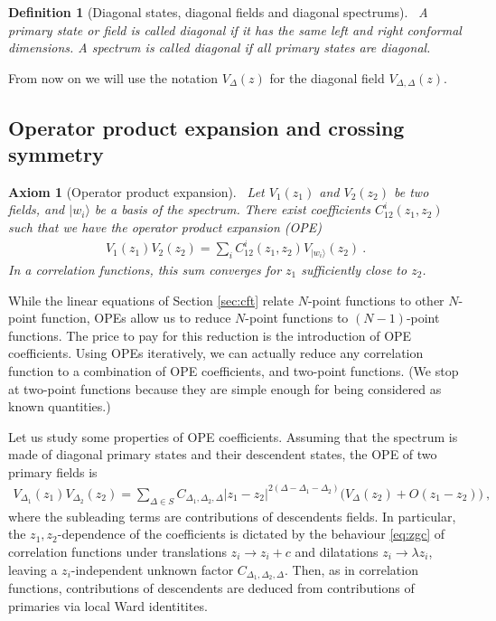 \documentclass[12pt, a4paper]{article}
\theoremstyle{break}
\newtheorem{hyp}[exo]{Axiom}
\newtheorem{defn}[exo]{Definition}
\begin{document}
\begin{defn}[Diagonal states, diagonal fields and diagonal spectrums]
 ~\label{def:diag}
 A primary state or field is called diagonal if it has the same left and right conformal dimensions. A spectrum is called diagonal if all primary states are diagonal.
\end{defn}
From now on we will use the notation $V_\Delta(z)$ for the diagonal field $V_{\Delta,\Delta}(z)$.

\subsection{Operator product expansion and crossing symmetry}

\begin{hyp}[Operator product expansion]
 ~\label{hyp:ope}
 Let $V_1(z_1)$ and $V_2(z_2)$ be two fields, and $|w_i\rangle$ be a basis of the spectrum.
 There exist coefficients $C^i_{12}(z_1,z_2)$ such that we have the operator product expansion (OPE) 
 \begin{align}
  V_1(z_1)V_2(z_2) = \sum_i C^i_{12}(z_1,z_2) V_{|w_i\rangle}(z_2)\ .
 \end{align}
 In a correlation functions,
 this sum converges for $z_1$ sufficiently close to $z_2$.
\end{hyp}
While the linear equations of Section \ref{sec:cft} relate $N$-point functions to other $N$-point function, OPEs allow us to reduce $N$-point functions to $(N-1)$-point functions. 
The price to pay for this reduction is the introduction of OPE coefficients. 
Using OPEs iteratively, we can actually reduce any correlation function to a combination of OPE coefficients, and two-point functions. (We stop at two-point functions because they are simple enough for being considered as known quantities.) 

Let us study some properties of OPE coefficients. 
Assuming that
the spectrum is made of diagonal primary states and their descendent states, the OPE of two primary fields is
\begin{align}
 V_{\Delta_1}(z_1) V_{\Delta_2}(z_2) 
 = \sum_{\Delta\in S} C_{\Delta_1,\Delta_2,\Delta} |z_1-z_2|^{2(\Delta-\Delta_1-\Delta_2)}
 \Big(V_{\Delta}(z_2) + O(z_1-z_2) \Big)\ ,
 \label{eq:ope}
\end{align}
where the subleading terms are contributions of descendents fields. 
In particular, the $z_1,z_2$-dependence of the coefficients is dictated by the behaviour \eqref{eq:zgc}
of correlation functions under translations $z_i\to z_i+c$ and dilatations $z_i\to\lambda z_i$, leaving a $z_i$-independent unknown factor $C_{\Delta_1,\Delta_2,\Delta}$.
Then, as in correlation functions, contributions of descendents are deduced from contributions of primaries via local Ward identitites.
\end{document}
